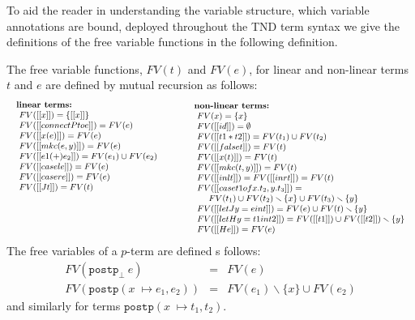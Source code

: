 To aid the reader in understanding the variable structure, which
variable annotations are bound, deployed throughout the TND term
syntax we give the definitions of the free variable functions in the
following definition.
\begin{definition}
The free variable functions, $FV(t)$ and $FV(e)$, for linear and
non-linear terms $t$ and $e$ are defined by mutual recursion as
follows:
\[ \small
\begin{array}{lll}  
  \begin{array}{lll}
    \textbf{linear terms:}\\
    \,\,FV([[x]])  = \{ [[x]]\}\\
    \,\,FV([[connectP to e]]) = FV(e) \\ 
    \,\,FV([[x(e)]]) = FV(e)\\
    \,\,FV([[mkc(e,y)]]) = FV(e)\\
    \,\,FV([[e1 (+) e_2]]) = FV(e_1) \cup FV(e_2)\\
    \,\,FV([[casel e]]) = FV(e)\\
    \,\,FV([[caser e]]) = FV(e)\\    
    \,\,FV([[J t]]) = FV(t)\\
    \\
    \\
    \\[13px]
  \end{array}
  & \quad &  
  \begin{array}{lll}
    \textbf{non-linear terms:}\\
    \,\,FV(x) = \{ x\}\\
    \,\,FV([[id]]) = \emptyset \\ 
    \,\,FV([[t1 * t2]])  = FV(t_1)\cup FV(t_2) \\
    \,\,FV([[false t]])  = FV(t) \\
    \,\,FV([[x(t)]]) = FV(t)\\
    \,\,FV([[mkc(t,y)]]) = FV(t)\\
    \,\,FV([[inl t]]) = FV([[inr t]]) = FV(t)\\
    \,\,FV([[case t1 of x.t_2,y.t_3]]) = \\
    \,\,\,\,\,\,\,\,\,\,FV(t_1)\cup FV(t_2)\smallsetminus\{x\}\cup FV(t_3)\smallsetminus \{y\}\\
    \,\,FV([[let J y = e in t]]) = FV(e)\cup FV(t)\smallsetminus \{y\} \\
    \,\,FV([[let H y = t1 in t2]]) = FV([[t1]])\cup FV([[t2]])\smallsetminus \{y\} \\
    \,\,FV([[H e]]) = FV(e)\\
  \end{array}
\end{array}
\]
The free variables of a $p$-term are defined s follows: 
\[
\begin{array}{rll}
  FV(\mathtt{postp}_{\bot}\ e) & = & FV(e)\\
  FV(\mathtt{postp} (x 􏰀\mapsto e_1, e_2)) & = & FV(e_1) \smallsetminus \{x\} \cup FV(e_2)
\end{array}
\] 
and similarly for terms $\mathtt{postp} (x 􏰀\mapsto t_1, t_2)$.
\end{definition}


